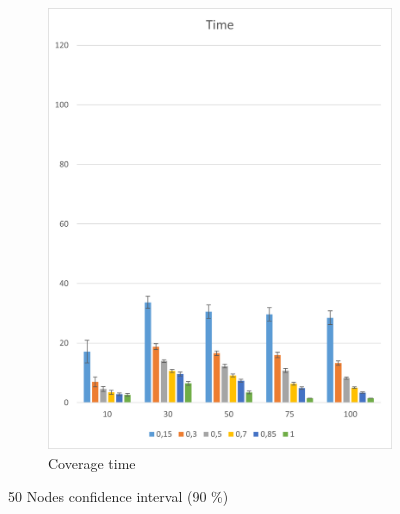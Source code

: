 \begin{figure}[H]
\begin{subfigure}{.5\textwidth}
  \includegraphics[width=1\linewidth]{./images/50endtimeCI.png}
  \caption{Coverage time}
  \label{fig:sub2}
\end{subfigure}
\caption{50 Nodes confidence interval (90 \%)}
\label{fig:test}
\end{figure}


